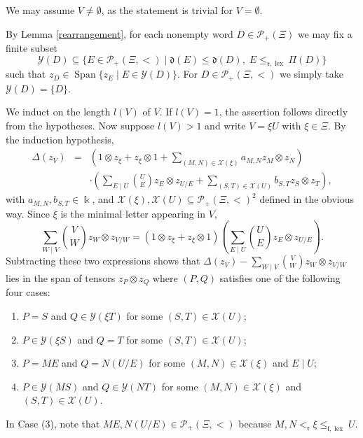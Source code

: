 \documentclass{article}
\makeatletter
\renewenvironment{proof}[1][\proofname]{\par
	\pushQED{\qed}%
	\normalfont \topsep6\p@\@plus6\p@\relax
	\trivlist
	\item[\hskip\labelsep
	\bfseries
	#1\@addpunct{.}]\ignorespaces
}{%
	\popQED\endtrivlist\@endpefalse
}
\theoremstyle{plain}
\theoremstyle{definition}
\numberwithin{equation}{section}
\DeclareMathOperator{\Span}{Span}
\DeclareMathOperator{\lex}{lex}
\newcommand{\PP}{\mathcal{P}}
\newcommand{\dd}{\mathfrak{d}}
\newcommand{\rr}{\mathfrak{r}}
\makeatother
\begin{document}
	\begin{proof}
		We may assume $V\neq \emptyset$, as the statement is trivial for $V=\emptyset$.
		
		By Lemma \ref{rearrangement}, for each nonempty word $D\in \PP_{+}(\Xi)$ we may fix a finite subset
		$$\mathcal{Y}(D) \subseteq \{E\in \PP_{+}(\Xi, <) \mid  \dd(E) \leq \dd(D),\; E\leq _{\rr,\lex} \Pi(D)\}$$
		such that $z_{D} \in \Span \{ z_{E} \mid E\in \mathcal{Y}(D)\}.$ For $D\in \PP_{+}(\Xi,<)$ we simply take $\mathcal{Y}(D) =\{D\}$.
		
		We induct on the length $l(V)$ of $V$. If $l(V)=1$, the assertion follows directly from the hypotheses. Now suppose $l(V)>1$ and write $V=\xi U$ with $\xi \in \Xi$. By the induction hypothesis,
		\begin{eqnarray*}
			\Delta(z_{V}) &=&
			\left(1\otimes z_{\xi}+z_{\xi}\otimes1+\sum_{(M,N)\in \mathcal{X}(\xi)} a_{M,N} z_{M}\otimes z_{N} \right) \\
			&& \cdot\left(\sum_{E\mid U}\binom{U}{E}z_{E}\otimes z_{U/E}+ \sum_{(S,T)\in \mathcal{X}(U)} b_{S,T} z_{S}\otimes z_{T}\right),
		\end{eqnarray*}
		with $a_{M,N},b_{S,T} \in \Bbbk$, and $\mathcal{X}(\xi), \mathcal{X}(U) \subseteq \PP_{+}(\Xi,<)^{2}$ defined in the obvious way. Since $\xi$ is the minimal letter appearing in $V$,
		\[
		\sum_{W\mid V}\binom{V}{W}z_{W} \otimes z_{V/W} = \left(1\otimes z_{\xi}+z_{\xi}\otimes1\right) \left(\sum_{E\mid U}\binom{U}{E}z_{E}\otimes z_{U/E}\right) .
		\]
		Subtracting these two expressions shows that $\Delta(z_{V}) - \sum_{W\mid V}\binom{V}{W}z_{W} \otimes z_{V/W}$ lies in the span of tensors $z_{P} \otimes z_{Q}$ where $(P,Q)$ satisfies one of the following four cases:
		\begin{enumerate}
			\item $P=S$ and $Q\in \mathcal{Y}(\xi T)$ for some $(S,T) \in \mathcal{X}(U)$;
			\item  $P\in \mathcal{Y}(\xi S)$ and $Q=T$ for some $(S,T) \in \mathcal{X}(U)$;
			\item  $P = ME$ and $Q=N(U/E)$ for some $(M,N)\in \mathcal{X}(\xi)$ and $E\mid U$;
			\item $P\in \mathcal{Y}(MS)$ and $Q\in \mathcal{Y}(NT)$ for some $(M,N)\in \mathcal{X}(\xi)$ and $(S,T) \in \mathcal{X}(U)$.
		\end{enumerate}
		In Case (3), note that $ME, N(U/E)\in \PP_{+}(\Xi, <)$ because $M, N<_{\rr} \xi \leq _{\mathfrak{l},\lex} U$.
		

\end{proof}
\end{document}
